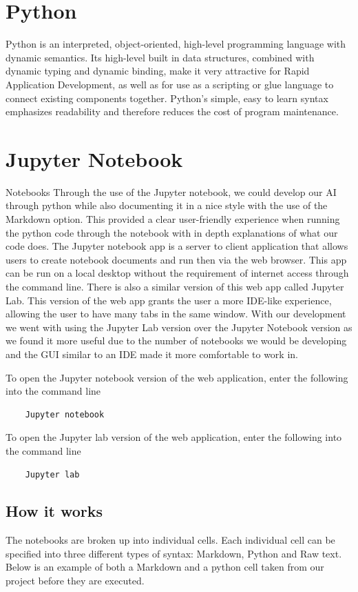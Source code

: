 \section{Python}
Python is an interpreted, object-oriented, high-level programming language with dynamic semantics. Its high-level built in data structures, combined with dynamic typing and dynamic binding, make it very attractive for Rapid Application Development, as well as for use as a scripting or glue language to connect existing components together. Python's simple, easy to learn syntax emphasizes readability and therefore reduces the cost of program maintenance. 

\section{Jupyter Notebook}
Notebooks
Through the use of the Jupyter notebook, we could develop our AI through python while also documenting it in a nice style with the use of the Markdown option. This provided a clear user-friendly experience when running the python code through the notebook with in depth explanations of what our code does. The Jupyter notebook app is a server to client application that allows users to create notebook documents and run then via the web browser. This app can be run on a local desktop without the requirement of internet access through the command line. There is also a similar version of this web app called Jupyter Lab. This version of the web app grants the user a more IDE-like experience, allowing the user to have many tabs in the same window. With our development we went with using the Jupyter Lab version over the Jupyter Notebook version as we found it more useful due to the number of notebooks we would be developing and the GUI similar to an IDE made it more comfortable to work in. 

To open the Jupyter notebook version of the web application, enter the following into the command line
\begin{verbatim}	
	Jupyter notebook 
\end{verbatim}
To open the Jupyter lab version of the web application, enter the following into the command line
\begin{verbatim}
	Jupyter lab 
\end{verbatim}

\subsection{How it works}
The notebooks are broken up into individual cells. Each individual cell can be specified into three different types of syntax: Markdown, Python and Raw text. Below is an example of both a Markdown and a python cell taken from our project before they are executed.

